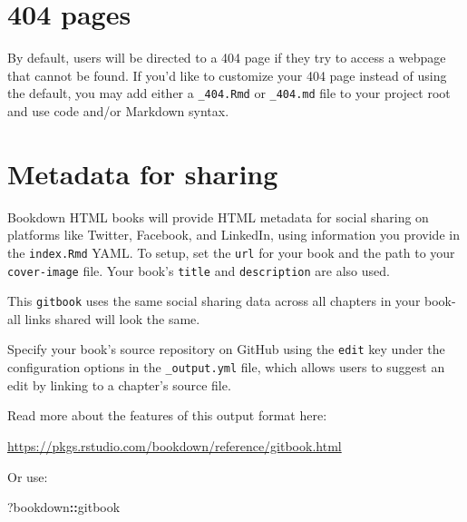 \documentclass[
]{book}
\newenvironment{Shaded}{\begin{snugshade}}{\end{snugshade}}
\newcommand{\NormalTok}[1]{#1}
\newcommand{\SpecialCharTok}[1]{\textcolor[rgb]{0.81,0.36,0.00}{\textbf{#1}}}
\theoremstyle{definition}
\theoremstyle{definition}
\theoremstyle{definition}
\theoremstyle{definition}
\theoremstyle{remark}
\begin{document}
\section{404 pages}\label{pages}

By default, users will be directed to a 404 page if they try to access a webpage that cannot be found. If you'd like to customize your 404 page instead of using the default, you may add either a \texttt{\_404.Rmd} or \texttt{\_404.md} file to your project root and use code and/or Markdown syntax.

\section{Metadata for sharing}\label{metadata-for-sharing}

Bookdown HTML books will provide HTML metadata for social sharing on platforms like Twitter, Facebook, and LinkedIn, using information you provide in the \texttt{index.Rmd} YAML. To setup, set the \texttt{url} for your book and the path to your \texttt{cover-image} file. Your book's \texttt{title} and \texttt{description} are also used.

This \texttt{gitbook} uses the same social sharing data across all chapters in your book- all links shared will look the same.

Specify your book's source repository on GitHub using the \texttt{edit} key under the configuration options in the \texttt{\_output.yml} file, which allows users to suggest an edit by linking to a chapter's source file.

Read more about the features of this output format here:

\url{https://pkgs.rstudio.com/bookdown/reference/gitbook.html}

Or use:

\begin{Shaded}
\begin{Highlighting}[]
\NormalTok{?bookdown}\SpecialCharTok{::}\NormalTok{gitbook}
\end{Highlighting}
\end{Shaded}



\end{document}

